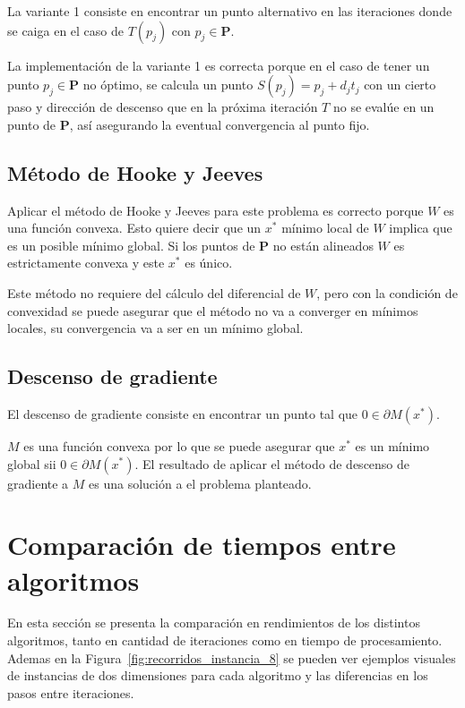 \documentclass[10pt]{article}
\begin{document}
La variante 1 consiste en encontrar un punto alternativo en las iteraciones donde se caiga en el caso de $T(p_j)$ con $p_j \in \mathbf{P}$.

 La implementación de la variante 1 es correcta porque en el caso de tener un punto $p_j \in \mathbf{P}$ no óptimo, se calcula un punto $S(p_j) = p_j + d_j t_j$ con un cierto paso y dirección de descenso que en la próxima iteración $T$ no se evalúe en un punto de $\mathbf{P}$, así asegurando la eventual convergencia al punto fijo.
\subsection{Método de Hooke y Jeeves}

Aplicar el método de Hooke y Jeeves para este problema es correcto porque $W$ es una función convexa. Esto quiere decir que un $x^*$ mínimo local de $W$ implica que es un posible mínimo global. Si los puntos de $\mathbf{P}$ no están alineados $W$ es estrictamente convexa y este $x^*$ es único.

Este método no requiere del cálculo del diferencial de $W$, pero con la condición de convexidad se puede asegurar que el método no va a converger en mínimos locales, su convergencia va a ser en un mínimo global.
	
\subsection{Descenso de gradiente}

El descenso de gradiente consiste en encontrar un punto tal que $0 \in \partial M(x^*)$. 

$M$ es una función convexa por lo que se puede asegurar que $x^*$ es un mínimo global sii $0 \in \partial M(x^*)$. El resultado de aplicar el método de descenso de gradiente a $M$ es una solución a el problema planteado.

\section{Comparación de tiempos entre algoritmos}
En esta sección se presenta la comparación en rendimientos de los distintos algoritmos, tanto en cantidad de iteraciones como en tiempo de procesamiento. Ademas en la Figura~\ref{fig:recorridos_instancia_8} se pueden ver ejemplos visuales de instancias de dos dimensiones para cada algoritmo y las diferencias en los pasos entre iteraciones.
\end{document}
